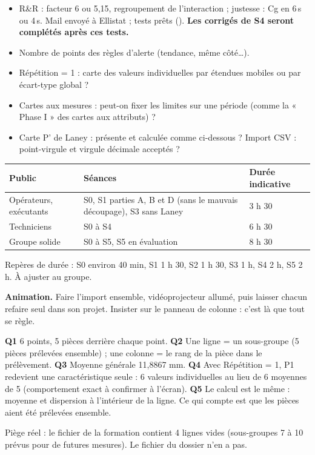 \documentclass[10pt,a4paper]{article}
\begin{document}
\begin{tcolorbox}[verif]
\begin{itemize}
\item R\&R : facteur 6 ou 5,15, regroupement de l'interaction ; justesse : Cg en 6\,s ou 4\,s. Mail envoyé à Ellistat ; tests prêts (). \textbf{Les corrigés de S4 seront complétés après ces tests.}
\item Nombre de points des règles d'alerte (tendance, même côté…).
\item Répétition = 1 : carte des valeurs individuelles par étendues mobiles ou par écart-type global ?
\item Cartes aux mesures : peut-on fixer les limites sur une période (comme la « Phase I » des cartes aux attributs) ?
\item Carte P' de Laney : présente et calculée comme ci-dessous ? Import CSV : point-virgule et virgule décimale acceptés ?
\end{itemize}
\end{tcolorbox}

\renewcommand{\arraystretch}{1.2}
\begin{tabularx}{\linewidth}{@{}l X l@{}}
\toprule
\textbf{Public} & \textbf{Séances} & \textbf{Durée indicative}\\\midrule
Opérateurs, exécutants & S0, S1 parties A, B et D (sans le mauvais découpage), S3 sans Laney & 3 h 30\\
Techniciens & S0 à S4 & 6 h 30\\
Groupe solide & S0 à S5, S5 en évaluation & 8 h 30\\
\bottomrule
\end{tabularx}
{\small Repères de durée : S0 environ 40 min, S1 1 h 30, S2 1 h 30, S3 1 h, S4 2 h, S5 2 h. À ajuster au groupe.}

\textbf{Animation.} Faire l'import ensemble, vidéoprojecteur allumé, puis laisser chacun refaire seul dans son projet. Insister sur le panneau de colonne : c'est là que tout se règle.
\begin{tcolorbox}[corr]
\textbf{Q1} 6 points, 5 pièces derrière chaque point. \textbf{Q2} Une ligne = un sous-groupe (5 pièces prélevées ensemble) ; une colonne = le rang de la pièce dans le prélèvement. \textbf{Q3} Moyenne générale 11,8867 mm. \textbf{Q4} Avec Répétition = 1, P1 redevient une caractéristique seule : 6 valeurs individuelles au lieu de 6 moyennes de 5 (comportement exact à confirmer à l'écran). \textbf{Q5} Le calcul est le même : moyenne et dispersion à l'intérieur de la ligne. Ce qui compte est que les pièces aient été prélevées ensemble.
\end{tcolorbox}
{\small Piège réel : le fichier  de la formation contient 4 lignes vides (sous-groupes 7 à 10 prévus pour de futures mesures). Le fichier du dossier  n'en a pas.}
\end{document}
